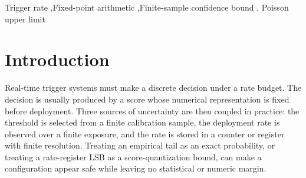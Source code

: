 \documentclass[preprint,12pt]{elsarticle}
\newcounter{bla}
\newenvironment{refnummer}{%
\list{[\arabic{bla}]}%
{\usecounter{bla}%
 \setlength{\itemindent}{0pt}%
 \setlength{\topsep}{0pt}%
 \setlength{\itemsep}{0pt}%
 \setlength{\labelsep}{2pt}%
 \setlength{\listparindent}{0pt}%
 \settowidth{\labelwidth}{[9]}%
 \setlength{\leftmargin}{\labelwidth}%
 \addtolength{\leftmargin}{\labelsep}%
 \setlength{\rightmargin}{0pt}}}
 {\endlist}
\begin{document}
\begin{frontmatter}
\begin{abstract}
\begin{small}
\vspace{2pt}
\begin{refnummer}
\item C.~J. Clopper and E.~S. Pearson, \textit{The use of confidence or
fiducial limits illustrated in the case of the binomial}, Biometrika
\textbf{26} (1934) 404--413.
\item J.~Lundberg, J.~Conrad, W.~Rolke and A.~Lopez, \textit{Limits, discovery
and cut optimization for a Poisson process with uncertainty in background and
signal efficiency: TRolke 2.0}, Comput.\ Phys.\ Commun.\ \textbf{181} (2010)
683--686.
\item J.~Conrad, \textit{A program for confidence interval calculations for a
Poisson process with background including systematic uncertainties: POLE 1.0},
Comput.\ Phys.\ Commun.\ \textbf{158} (2004) 117--123.
\end{refnummer}
\end{small}

\vspace{4pt}
\end{abstract}

\begin{keyword}
Trigger rate \sep Fixed-point arithmetic \sep Finite-sample confidence bound \sep
Poisson upper limit
\end{keyword}

\end{frontmatter}

\section{Introduction}
\label{sec:intro}

Real-time trigger systems must make a discrete decision under a rate budget.
The decision is usually produced by a score whose numerical representation is
fixed before deployment.  Three sources of uncertainty are then coupled in
practice: the threshold is selected from a finite calibration sample, the
deployment rate is observed over a finite exposure, and the rate is stored in a
counter or register with finite resolution.  Treating an empirical tail as an
exact probability, or treating a rate-register LSB as a score-quantization
bound, can make a configuration appear safe while leaving no statistical or
numeric margin.
\end{document}
